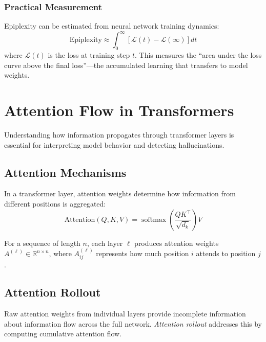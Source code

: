 \documentclass[11pt]{article}
\newcommand{\R}{\mathbb{R}}
\DeclareMathOperator{\softmax}{softmax}
\begin{document}
\subsubsection{Practical Measurement}

Epiplexity can be estimated from neural network training dynamics:
\begin{equation}
\text{Epiplexity} \approx \int_0^\infty \left[\mathcal{L}(t) - \mathcal{L}(\infty)\right] dt
\end{equation}
where $\mathcal{L}(t)$ is the loss at training step $t$. This measures the ``area under the loss curve above the final loss''---the accumulated learning that transfers to model weights.

\section{Attention Flow in Transformers}

Understanding how information propagates through transformer layers is essential for interpreting model behavior and detecting hallucinations.

\subsection{Attention Mechanisms}

In a transformer layer, attention weights determine how information from different positions is aggregated:
\begin{equation}
\text{Attention}(Q, K, V) = \softmax\left(\frac{QK^\top}{\sqrt{d_k}}\right)V
\end{equation}

For a sequence of length $n$, each layer $\ell$ produces attention weights $A^{(\ell)} \in \R^{n \times n}$, where $A^{(\ell)}_{ij}$ represents how much position $i$ attends to position $j$.

\subsection{Attention Rollout}

Raw attention weights from individual layers provide incomplete information about information flow across the full network. \emph{Attention rollout} addresses this by computing cumulative attention flow.
\end{document}
